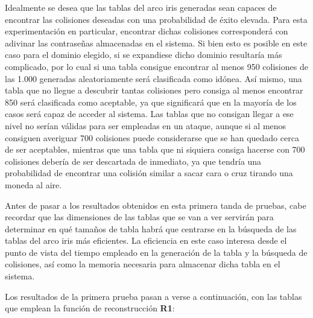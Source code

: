 \documentclass[12pt,spanish,listoffigures,listoftables,listofalgorithms]{tfgetsinf}
\begin{document}
Idealmente se desea que las tablas del arco iris generadas sean capaces de encontrar las colisiones deseadas con una probabilidad de éxito elevada. Para esta experimentación en particular, encontrar dichas colisiones corresponderá con adivinar las contraseñas almacenadas en el sistema. Si bien esto es posible en este caso para el dominio elegido, si se expandiese dicho dominio resultaría más complicado, por lo cual si una tabla consigue encontrar al menos 950 colisiones de las 1.000 generadas aleatoriamente será clasificada como idónea. Así mismo, una tabla que no llegue a descubrir tantas colisiones pero consiga al menos encontrar 850 será clasificada como aceptable, ya que significará que en la mayoría de los casos será capaz de acceder al sistema. Las tablas que no consigan llegar a ese nivel no serían válidas para ser empleadas en un ataque, aunque si al menos consiguen averiguar 700 colisiones puede considerarse que se han quedado cerca de ser aceptables, mientras que una tabla que ni siquiera consiga hacerse con 700 colisiones debería de ser descartada de inmediato, ya que tendría una probabilidad de encontrar una colisión similar a sacar cara o cruz tirando una moneda al aire.

Antes de pasar a los resultados obtenidos en esta primera tanda de pruebas, cabe recordar que las dimensiones de las tablas que se van a ver servirán para determinar en qué tamaños de tabla habrá que centrarse en la búsqueda de las tablas del arco iris más eficientes. La eficiencia en este caso interesa desde el punto de vista del tiempo empleado en la generación de la tabla y la búsqueda de colisiones, así como la memoria necesaria para almacenar dicha tabla en el sistema. 

Los resultados de la primera prueba pasan a verse a continuación, con las tablas que emplean la función de reconstrucción \textbf{R1}:
\end{document}
